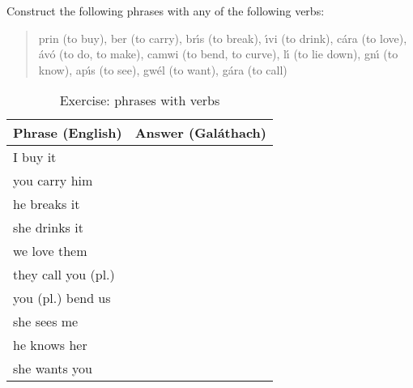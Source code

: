 Construct the following phrases with any of the following verbs:\\

\begin{quote}
prin (to buy), ber (to carry), br\'{\i}s (to break), \'{\i}vi (to drink), c\'{a}ra (to love), \'{a}v\'{o} (to do, to make), camwi (to bend, to curve), l\'{\i} (to lie down), gn\'{\i} (to know), ap\'{\i}s (to see), gw\'{e}l (to want), g\'{a}ra (to call)
\end{quote}

\begin{table}[H]
\centering
\begin{tabular}{|l|M{10.0cm}|}
  \toprule
  \textbf{Phrase (English)} & \textbf{Answer (Gal\'{a}thach)}\\
  \toprule
  I buy it & \\
  \midrule
  you carry him & \\
  \midrule
  he breaks it & \\
  \midrule
  she drinks it & \\
  \midrule
  we love them & \\
  \midrule
  they call you (pl.) & \\
  \midrule
  you (pl.) bend us & \\
  \midrule
  she sees me & \\
  \midrule
  he knows her & \\
  \midrule
  she wants you & \\
  \bottomrule
\end{tabular}
\label{exercise_phrases_with_verbs}
\caption{Exercise: phrases with verbs}
\end{table}

\newpage
